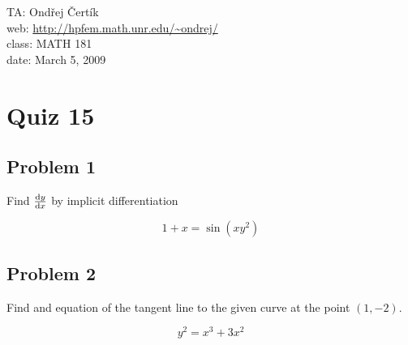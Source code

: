 \documentclass[10pt]{article}
\begin{document}
\noindent TA: Ondřej Čertík\\
web: \url{http://hpfem.math.unr.edu/~ondrej/}\\
class: MATH 181\\
date: March 5, 2009

\section*{Quiz 15}

\subsection*{Problem 1}

Find ${{\rm d} y\over {\rm d} x}$ by implicit differentiation

$$1+x=\sin(xy^2)$$

\subsection*{Problem 2}

Find and equation of the tangent line to the given curve at the point $(1,
-2)$.

$$y^2=x^3+3x^2$$
\end{document}
